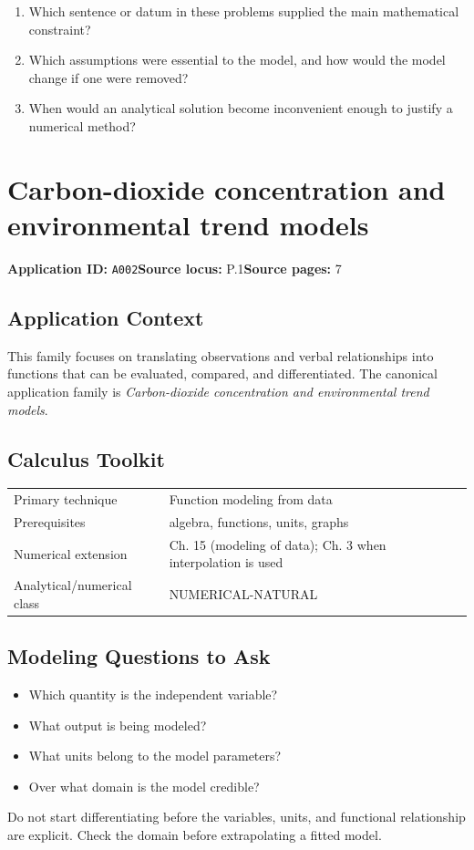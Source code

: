 \documentclass[11pt]{book}
\newcommand{\pid}[1]{\texttt{#1}}
\begin{document}
\begin{reflectionbox}\begin{enumerate}
\item Which sentence or datum in these problems supplied the main mathematical constraint?
\item Which assumptions were essential to the model, and how would the model change if one were removed?
\item When would an analytical solution become inconvenient enough to justify a numerical method?
\end{enumerate}\end{reflectionbox}
\chapter{Carbon-dioxide concentration and environmental trend models}\label{app:A002}
\textbf{Application ID:} \pid{A002}\quad \textbf{Source locus:} P.1\quad \textbf{Source pages:} 7
\section*{Application Context}
This family focuses on translating observations and verbal relationships into functions that can be evaluated, compared, and differentiated. The canonical application family is \emph{Carbon-dioxide concentration and environmental trend models}.
\section*{Calculus Toolkit}
\begin{tabularx}{\textwidth}{@{}lX@{}}\toprule
Primary technique & Function modeling from data \\
Prerequisites & algebra, functions, units, graphs \\
Numerical extension & Ch. 15 (modeling of data); Ch. 3 when interpolation is used \\
Analytical/numerical class & NUMERICAL-NATURAL \\
\bottomrule\end{tabularx}
\section*{Modeling Questions to Ask}\begin{itemize}
\item Which quantity is the independent variable?
\item What output is being modeled?
\item What units belong to the model parameters?
\item Over what domain is the model credible?
\end{itemize}
\begin{errorbox}Do not start differentiating before the variables, units, and functional relationship are explicit. Check the domain before extrapolating a fitted model.\end{errorbox}
\end{document}
